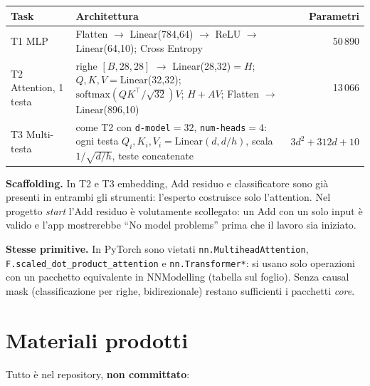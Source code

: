 \documentclass[10pt,a4paper]{article}
\begin{document}
\begin{table}[H]
\centering\small
\begin{tabularx}{\textwidth}{@{}l>{\raggedright\arraybackslash}Xr@{}}
\toprule
Task & Architettura & Parametri \\
\midrule
T1 MLP & Flatten \(\to\) Linear(784,64) \(\to\) ReLU \(\to\) Linear(64,10); Cross Entropy & 50\,890 \\
T2 Attention, 1 testa & righe \([B,28,28]\) \(\to\) Linear(28,32)\(=H\);
\(Q,K,V=\)Linear(32,32); \(\mathrm{softmax}(QK^\top/\sqrt{32})V\); \(H+AV\);
Flatten \(\to\) Linear(896,10) & 13\,066 \\
T3 Multi-testa & come T2 con \texttt{d-model}\(=32\), \texttt{num-heads}\(=4\): ogni testa
\(Q_i,K_i,V_i=\)Linear\((d,d/h)\), scala \(1/\sqrt{d/h}\), teste concatenate &
\(3d^2+312d+10\) \\
\bottomrule
\end{tabularx}
\end{table}

\textbf{Scaffolding.} In T2 e T3 embedding, Add residuo e classificatore sono già
presenti in entrambi gli strumenti: l'esperto costruisce solo l'attention. Nel
progetto \emph{start} l'Add residuo è volutamente scollegato: un Add con un solo
input è valido e l'app mostrerebbe ``No model problems'' prima che il lavoro sia
iniziato.

\textbf{Stesse primitive.} In PyTorch sono vietati \texttt{nn.MultiheadAttention},
\texttt{F.scaled\_dot\_product\_attention} e \texttt{nn.Transformer*}: si usano solo
operazioni con un pacchetto equivalente in NNModelling (tabella sul foglio).
Senza causal mask (classificazione per righe, bidirezionale) restano sufficienti
i pacchetti \emph{core}.

\section{Materiali prodotti}

Tutto è nel repository, \textbf{non committato}:
\end{document}
